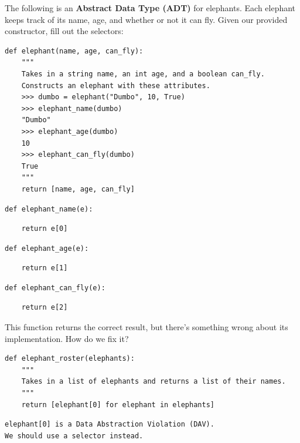 \documentclass{exam}
\begin{document}
\begin{questions}
\begin{blocksection}
\question The following is an \textbf{Abstract Data Type (ADT)} for elephants.
Each elephant keeps track of its name, age, and whether or not it can fly. Given
our provided constructor, fill out the selectors:

\begin{lstlisting}
def elephant(name, age, can_fly):
    """
    Takes in a string name, an int age, and a boolean can_fly.
    Constructs an elephant with these attributes.
    >>> dumbo = elephant("Dumbo", 10, True)
    >>> elephant_name(dumbo)
    "Dumbo"
    >>> elephant_age(dumbo)
    10
    >>> elephant_can_fly(dumbo)
    True
    """
    return [name, age, can_fly]
\end{lstlisting}

\begin{lstlisting}
def elephant_name(e):
\end{lstlisting}
\begin{solution}[1in]
\begin{lstlisting}
    return e[0]
\end{lstlisting}
\end{solution}

\begin{lstlisting}
def elephant_age(e):
\end{lstlisting}
\begin{solution}[1in]
\begin{lstlisting}
    return e[1]
\end{lstlisting}
\end{solution}

\begin{lstlisting}
def elephant_can_fly(e):
\end{lstlisting}
\begin{solution}[1in]
\begin{lstlisting}
    return e[2]
\end{lstlisting}
\end{solution}
\end{blocksection}


\begin{blocksection}
\question This function returns the correct result, but there's something wrong
about its implementation. How do we fix it?

\begin{lstlisting}
def elephant_roster(elephants):
    """
    Takes in a list of elephants and returns a list of their names.
    """
    return [elephant[0] for elephant in elephants]
\end{lstlisting}
\begin{solution}[1in]
\begin{lstlisting}[language=HTML]
elephant[0] is a Data Abstraction Violation (DAV).
We should use a selector instead.
\end{lstlisting}
\end{solution}


\end{blocksection}
\end{questions}
\end{document}
